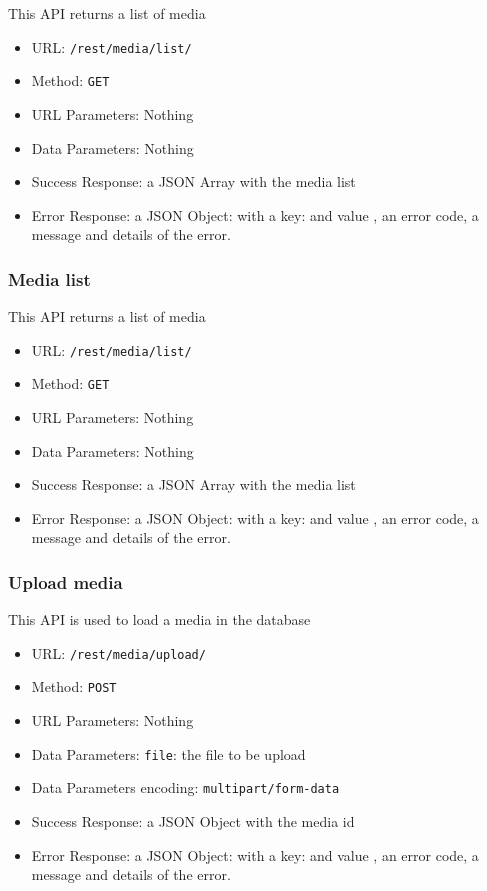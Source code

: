 This API returns a list of media

\begin{itemize}
    \item URL: \texttt{/rest/media/list/}
    \item Method: \texttt{GET}
    \item URL Parameters: Nothing
    \item Data Parameters: Nothing
    \item Success Response: a JSON Array with the media list
    \item Error Response: a JSON Object: with a key:   and value , an error code, a message and details of the error.
\end{itemize}

\subsubsection*{Media list}

This API returns a list of media

\begin{itemize}
    \item URL: \texttt{/rest/media/list/}
    \item Method: \texttt{GET}
    \item URL Parameters: Nothing
    \item Data Parameters: Nothing
    \item Success Response: a JSON Array with the media list
    \item Error Response: a JSON Object: with a key:   and value , an error code, a message and details of the error.
\end{itemize}

\subsubsection*{Upload media}

This API is used to load a media in the database

\begin{itemize}
    \item URL: \texttt{/rest/media/upload/}
    \item Method: \texttt{POST}
    \item URL Parameters: Nothing
    \item Data Parameters: \texttt{file}: the file to be upload
    \item Data Parameters encoding: \texttt{multipart/form-data}
    \item Success Response: a JSON Object with the media id
    \item Error Response: a JSON Object: with a key:   and value , an error code, a message and details of the error.
\end{itemize}

